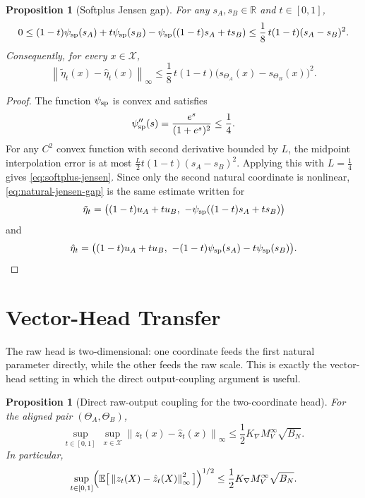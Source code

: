 \documentclass[11pt]{article}
\newtheorem{proposition}[theorem]{Proposition}
\theoremstyle{definition}
\newcommand{\R}{\mathbb{R}}
\newcommand{\E}{\mathbb{E}}
\newcommand{\norm}[1]{\left\lVert #1 \right\rVert}
\newcommand{\mc}[1]{\mathcal{#1}}
\begin{document}
\begin{proposition}[Softplus Jensen gap]
\label{prop:softplus-jensen}
For any $s_A,s_B\in\R$ and $t\in[0,1]$,
\begin{equation}
  0
  \le
  (1-t)\psi_{\rm sp}(s_A)+t\psi_{\rm sp}(s_B)
  -
  \psi_{\rm sp}((1-t)s_A+ts_B)
  \le
  \frac18\,t(1-t)(s_A-s_B)^2.
  \label{eq:softplus-jensen}
\end{equation}
Consequently, for every $x\in\mc{X}$,
\begin{equation}
  \norm{\tilde\eta_t(x)-\hat\eta_t(x)}_\infty
  \le
  \frac18\,t(1-t)\bigl(s_{\Theta_A}(x)-s_{\Theta_B}(x)\bigr)^2.
  \label{eq:natural-jensen-gap}
\end{equation}
\end{proposition}

\begin{proof}
The function $\psi_{\rm sp}$ is convex and satisfies
\[
  \psi_{\rm sp}''(s)
  =
  \frac{e^s}{(1+e^s)^2}
  \le
  \frac14.
\]
For any $C^2$ convex function with second derivative bounded by $L$,
the midpoint interpolation error is at most
$\frac{L}{2}t(1-t)(s_A-s_B)^2$. Applying this with
$L=\frac14$ gives \eqref{eq:softplus-jensen}.
Since only the second natural coordinate is nonlinear,
\eqref{eq:natural-jensen-gap} is the same estimate written for
\[
  \tilde\eta_t
  =
  \bigl((1-t)u_A+tu_B,\ -\psi_{\rm sp}((1-t)s_A+ts_B)\bigr)
\]
and
\[
  \hat\eta_t
  =
  \bigl((1-t)u_A+tu_B,\ -(1-t)\psi_{\rm sp}(s_A)-t\psi_{\rm sp}(s_B)\bigr).
\]
\end{proof}

\section{Vector-Head Transfer}

The raw head is two-dimensional: one coordinate feeds the first natural
parameter directly, while the other feeds the raw scale. This is exactly the
vector-head setting in which the direct output-coupling argument is useful.

\begin{proposition}[Direct raw-output coupling for the two-coordinate head]
\label{prop:vector-head-transfer}
For the aligned pair $(\Theta_A,\Theta_B)$,
\begin{equation}
  \sup_{t\in[0,1]}\ \sup_{x\in\mc{X}}
  \norm{z_t(x)-\hat z_t(x)}_\infty
  \le
  \frac12 K_{\nabla} M_V^\infty \sqrt{B_N}.
  \label{eq:vector-transfer}
\end{equation}
In particular,
\[
  \sup_{t\in[0,1]}
  \Bigl(
    \E\big[\norm{z_t(X)-\hat z_t(X)}_\infty^2\big]
  \Bigr)^{1/2}
  \le
  \frac12 K_{\nabla} M_V^\infty \sqrt{B_N}.
\]
\end{proposition}
\end{document}
